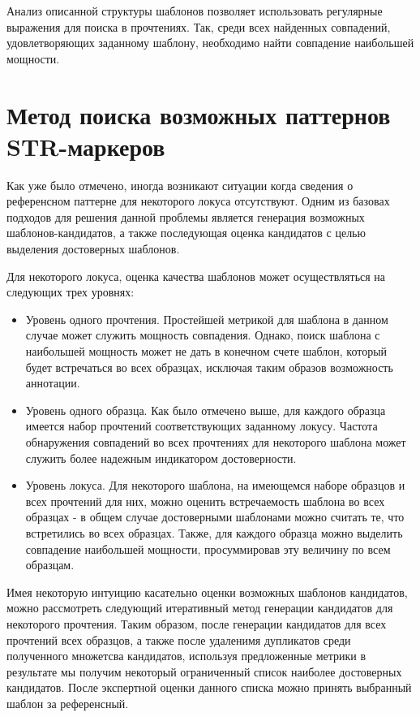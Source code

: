 Анализ описанной структуры шаблонов позволяет использовать регулярные выражения для поиска в прочтениях.
Так, среди всех найденных совпадений, удовлетворяющих заданному шаблону, необходимо найти
совпадение наибольшей мощности.

\section{Метод поиска возможных паттернов STR-маркеров}

Как уже было отмечено, иногда возникают ситуации когда сведения о референсном паттерне для
некоторого локуса отсутствуют. Одним из базовах подходов для решения данной проблемы является
генерация возможных шаблонов-кандидатов, а также последующая оценка кандидатов с целью выделения
достоверных шаблонов.

Для некоторого локуса, оценка качества шаблонов может осуществляться на следующих трех уровнях:
\begin{itemize}
\item Уровень одного прочтения. Простейшей метрикой для шаблона в данном случае может служить
мощность совпадения. Однако, поиск шаблона с наибольшей мощность может не дать в конечном счете
шаблон, который будет встречаться во всех образцах, исключая таким образов возможность аннотации.

\item Уровень одного образца. Как было отмечено выше, для каждого образца имеется
набор прочтений соответствующих заданному локусу. Частота обнаружения совпадений
во всех прочтениях для некоторого шаблона может служить более надежным индикатором
достоверности.

\item Уровень локуса. Для некоторого шаблона, на имеющемся наборе образцов и всех прочтений
для них, можно оценить встречаемость шаблона во всех образцах - в общем случае достоверными шаблонами можно считать
те, что встретились во всех образцах. Также, для каждого образца можно выделить совпадение наибольшей мощности,
просуммировав эту величину по всем образцам.
\end{itemize}

Имея некоторую интуицию касательно оценки возможных шаблонов кандидатов, можно рассмотреть
следующий итеративный метод генерации кандидатов для некоторого прочтения. Таким образом, после генерации
кандидатов для всех прочтений всех образцов, а также после удаленимя дупликатов среди полученного
множетсва кандидатов, используя предложенные метрики в результате мы получим некоторый
ограниченный список наиболее достоверных кандидатов. После экспертной оценки данного списка
можно принять выбранный шаблон за референсный.

